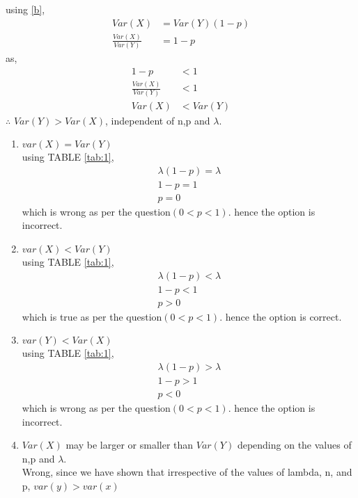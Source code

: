 \documentclass[journal,12pt,twocolumn]{IEEEtran}
\begin{document}
using \eqref{b},
\begin{align}
Var(X)&=Var(Y)(1-p)\\
\frac{Var(X)}{Var(Y)}&= 1-p
\end{align}
as,
\begin{align}
1-p &<1\\
\frac{Var(X)}{Var(Y)}&<1\\
Var(X) &< Var(Y)
\end{align}
$\therefore$ $Var(Y) >Var(X)$, independent of n,p and $\lambda$.
\begin{enumerate}
    \item $var(X)=Var(Y)$\\
          using TABLE \ref{tab:1},
          \begin{align}
          \lambda(1-p) = \lambda\\
          1-p=1\\
          p=0
          \end{align}
          which is wrong as per the question$(0<p<1)$.
          hence the option is incorrect.
    \item $var(X)<Var(Y)$\\
          using TABLE \ref{tab:1},
          \begin{align}
          \lambda(1-p) < \lambda\\
          1-p<1\\
          p>0
          \end{align}
          which is true as per the question$(0<p<1)$.
          hence the option is correct.
    \item $var(Y)<Var(X)$\\
     using TABLE \ref{tab:1},
          \begin{align}
          \lambda(1-p) > \lambda\\
          1-p>1\\
          p<0
          \end{align}
          which is wrong as per the question$(0<p<1)$.
          hence the option is incorrect.
    \item $Var(X)$ may be larger or smaller than $Var(Y)$ depending on the values of n,p and $\lambda$.\\
    Wrong, since we have shown that irrespective of the values of lambda, n, and p, $var(y) > var(x)$
\end{enumerate}
\end{document}
